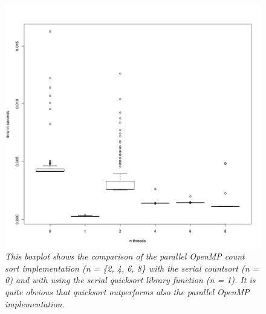 \documentclass[a4paper,11pt,twoside]{article}
\begin{document}
\begin{figure}

  \centering
  \includegraphics[width=1\textwidth]{countsort.png}
  \caption{\textit{This boxplot shows the comparison of the parallel OpenMP count sort implementation (n = \{2, 4, 6, 8\} with the serial countsort (n = 0) and with using the serial quicksort library function (n = 1). It is quite obvious that quicksort outperforms also the parallel OpenMP implementation.}}
  \label{fig:countsort}
\end{figure}
\end{document}
